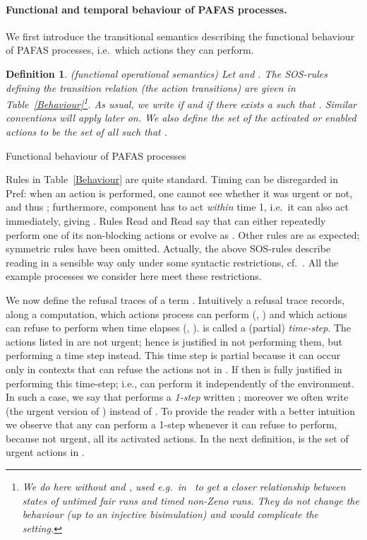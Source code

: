 \documentclass[copyright,creativecommons]{eptcs}
\newtheorem{definition}[theorem]{Definition}
\def\name#1{\mbox{\sc #1}}
\begin{document}
\paragraph{Functional and temporal behaviour of PAFAS processes.}
\label{secTimedSem}
We first introduce the transitional semantics describing the functional
behaviour of PAFAS processes, i.e.\ which actions they can perform.
\begin{definition}\label{PACTSOS}\rm({\em functional operational
semantics})
Let  and . The SOS-rules defining the transition
relation   (the {\em action
transitions}) are given in Table~\ref{Behaviour}\footnote{We do here
without  and , used e.g.\ in~\cite{CDV06} to get
a closer relationship between states of untimed fair runs and timed
non-Zeno runs. They do not change the behaviour (up to an injective
bisimulation) and would complicate the setting.}. As usual, we write
 if  and  if
there exists a  such that . Similar
conventions will apply later on. We also define the set of the {\em
activated} or enabled actions to be the set of all  such that
.
\end{definition}

\vspace{-0.8cm}
\begin{table}[tbh]
\small

\caption{Functional behaviour of PAFAS processes}
\label{Behaviour}
\end{table}

Rules in Table~\ref{Behaviour} are quite standard. Timing can be
disregarded in \name{Pref}: when an action is performed, one cannot see
whether it was urgent or not, and thus ; furthermore, component  has to act {\em within} time 1, i.e.\
it can also act immediately, giving . Rules
\name{Read} and \name{Read} say that  can either repeatedly perform one of its non-blocking actions or
evolve as . Other rules are as expected; symmetric rules have been
omitted.
Actually, the above SOS-rules describe reading in a sensible way only under
some syntactic restrictions, cf.~\cite{CDV08tr}. All the example processes
we consider here meet these restrictions.


We now define the refusal traces of a term . Intuitively a
refusal trace records, along a computation, which actions process  can
perform (, ) and which actions  can
refuse to perform when time elapses (, ).
 is called a (partial) {\it time-step}. The actions listed
in  are not urgent; hence  is justified in not performing them, but
performing a time step instead. This time step is partial because it can
occur only in contexts that can refuse the actions not in . If 
then  is fully justified in performing this time-step; i.e.,  can
perform it independently of the environment. In such a case, we say that
 performs a {\it 1-step} written ; moreover we often
write  (the urgent version of ) instead of . To
provide the reader with a better intuition we observe that any  can
perform a 1-step whenever it can refuse to perform, because not urgent, all
its activated actions. In the next definition,  is the set of urgent actions in . 
\end{document}
